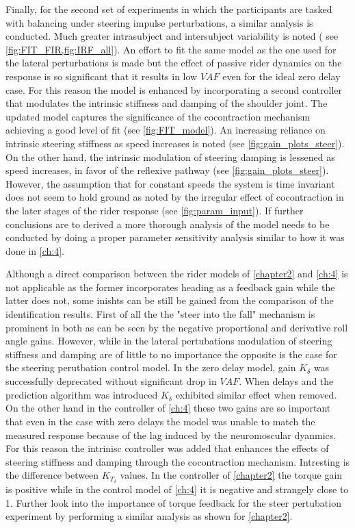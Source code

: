 Finally, for the second set of experiments in which the participants are tasked with balancing under steering impulse perturbations, a similar analysis is conducted. Much greater intrasubject and intersubject variability is noted ( see \cref{fig:FIT_FIR,fig:IRF_all}). An effort to fit the same model as the one used for the lateral perturbations is made but the effect of passive rider dynamics on the response is so significant that it results in low \ensuremath{\mathit{VAF}} even for the ideal zero delay case. For this reason the model is enhanced by incorporating a second controller that modulates the intrinsic stiffness and damping of the shoulder joint. The updated model captures the significance of the cocontraction mechanism achieving a good level of fit (see \cref{fig:FIT_model}). An increasing reliance on intrinsic steering stiffness as speed increases is noted (see \cref{fig:gain_plots_steer}). On the other hand, the intrinsic modulation of steering damping is lessened as speed increases, in favor of the reflexive pathway (see \cref{fig:gain_plots_steer}). However, the assumption that for constant speeds the system is time invariant does not seem to hold ground as noted by the irregular effect of cocontraction in the later stages of the rider  response (see \cref{fig:param_input}). If further conclusions are to derived a more thorough analysis of the model needs to be conducted by doing a proper parameter sensitivity analysis similar to how it was done in \cref{ch:4}.

Although a direct comparison between the rider models of \cref{chapter2} and \cref{ch:4} is not applicable as the former incorporates heading as a feedback gain while the latter does not, some inishts can be still be gained from the comparison of the identification results. First of all the the "steer into the fall" mechanism is prominent in both as can be seen by the negative proportional and derivative roll angle gains. However, while in the lateral pertubations modulation of steering stiffness and damping are of little to no importance the opposite is the case for the steering perutbation control model. In the zero delay model, gain \ensuremath{K_\delta} was successfully deprecated without  significant drop in \ensuremath{\mathit{VAF}}. When delays and the prediction algorithm was introduced \ensuremath{K_{\dot{\delta}}} exhibited similar effect when removed. On the other hand in the controller of \cref{ch:4} these two gains are so important that even in the case with zero delays the model was unable to match the measured response because of the lag induced by the neuromoscular dyanmics. For this reason the intrinisc controller was added that enhances the effects of steering stiffness and damping through the cocontraction mechanism. Intresting is the difference between \ensuremath{K_{T_\delta}} values. In the controller of \cref{chapter2} the torque gain is positive while in the control model of \cref{ch:4} it is negative and strangely close to 1. Further look into the importance of torque feedback for the steer pertubation experiment by performing a similar analysis as shown for \cref{chapter2}. 
